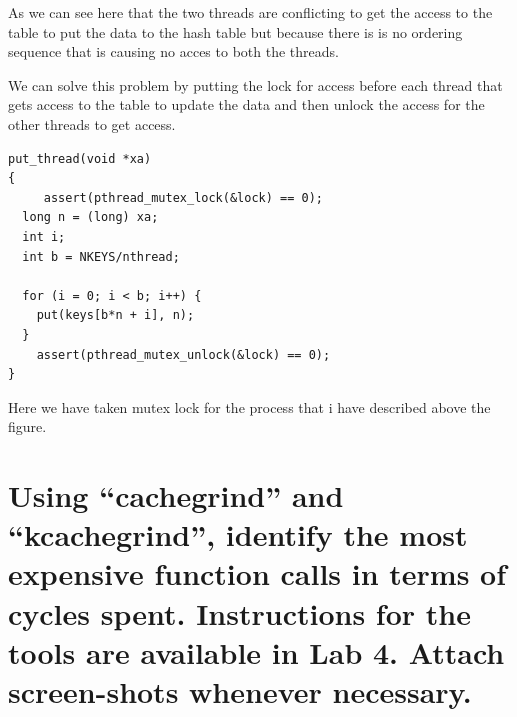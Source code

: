 \documentclass{sem5}
\begin{document}
\begin{itemize}
As we can see here that the two threads are conflicting to get the access to the table to put the data to the hash table but because there is is no ordering sequence that is causing no acces to both the threads.

 We can solve this problem by putting the lock for access before each thread that gets access to the table to update the data and then unlock the access for the other threads to get access.  


\begin{lstlisting}
put_thread(void *xa) 
{ 
	 assert(pthread_mutex_lock(&lock) == 0); 
  long n = (long) xa; 
  int i; 
  int b = NKEYS/nthread; 

  for (i = 0; i < b; i++) { 
    put(keys[b*n + i], n); 
  } 
    assert(pthread_mutex_unlock(&lock) == 0); 
}
\end{lstlisting}

Here we have taken mutex lock for the process that i have described above the figure.

\section{ Using “cachegrind” and “kcachegrind”, identify the most expensive function calls in terms of cycles spent. Instructions for the tools are available in Lab 4. Attach screen-shots whenever necessary.
}


\end{itemize}
\end{document}
